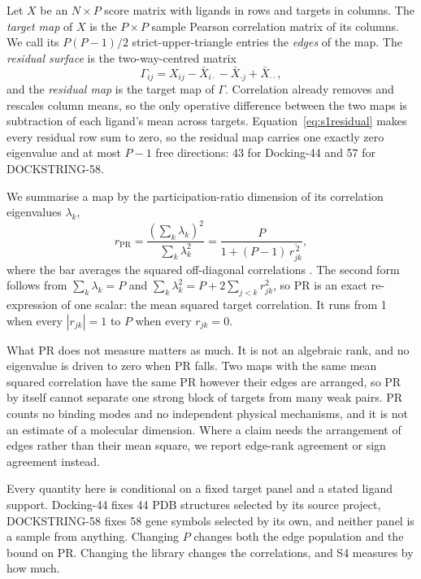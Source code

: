 Let $X$ be an $N\times P$ score matrix with ligands in rows and targets in columns. The
\emph{target map} of $X$ is the $P\times P$ sample Pearson correlation matrix of its columns.
We call its $P(P-1)/2$ strict-upper-triangle entries the \emph{edges} of the map. The
\emph{residual surface} is the two-way-centred matrix
\begin{equation}
\Gamma_{ij}=X_{ij}-\bar X_{i\cdot}-\bar X_{\cdot j}+\bar X_{\cdot\cdot},
\label{eq:s1residual}
\end{equation}
and the \emph{residual map} is the target map of $\Gamma$. Correlation already removes and
rescales column means, so the only operative difference between the two maps is subtraction of
each ligand's mean across targets. Equation~\ref{eq:s1residual} makes every residual row sum to
zero, so the residual map carries one exactly zero eigenvalue and at most $P-1$ free
directions: 43 for Docking-44 and 57 for DOCKSTRING-58.

We summarise a map by the participation-ratio dimension of its correlation eigenvalues
$\lambda_k$,
\begin{equation}
r_{\mathrm{PR}}=\frac{\left(\sum_k\lambda_k\right)^2}{\sum_k\lambda_k^2}
=\frac{P}{1+(P-1)\,\overline{r_{jk}^{\,2}}},
\label{eq:s1pr}
\end{equation}
where the bar averages the squared off-diagonal correlations \cite{roy2007,mazzucato2016}. The
second form follows from $\sum_k\lambda_k=P$ and $\sum_k\lambda_k^2=P+2\sum_{j<k}r_{jk}^2$, so
PR is an exact re-expression of one scalar: the mean squared target correlation. It runs from 1
when every $|r_{jk}|=1$ to $P$ when every $r_{jk}=0$.

What PR does not measure matters as much. It is not an algebraic rank, and no eigenvalue is
driven to zero when PR falls. Two maps with the same mean squared correlation have the same PR
however their edges are arranged, so PR by itself cannot separate one strong block of targets
from many weak pairs. PR counts no binding modes and no independent physical mechanisms, and it
is not an estimate of a molecular dimension. Where a claim needs the arrangement of edges
rather than their mean square, we report edge-rank agreement or sign agreement instead.

Every quantity here is conditional on a fixed target panel and a stated ligand support.
Docking-44 fixes 44 PDB structures selected by its source project, DOCKSTRING-58 fixes 58 gene
symbols selected by its own, and neither panel is a sample from anything. Changing $P$ changes
both the edge population and the bound on PR. Changing the library changes the correlations,
and S4 measures by how much.


